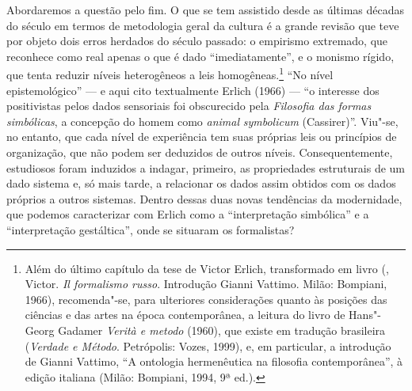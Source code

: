 Abordaremos a questão pelo fim. O que se tem assistido desde as últimas
décadas do século  em termos de metodologia geral da cultura é a
grande revisão que teve por objeto dois erros herdados do século
passado: o empirismo extremado, que reconhece como real apenas o que é
dado ``imediatamente'', e o monismo rígido, que tenta reduzir níveis
heterogêneos a leis homogêneas.\footnote{Além do último capítulo da
  tese de Victor Erlich, transformado em livro (, Victor. \emph{Il formalismo russo}. Introdução Gianni Vattimo. Milão: Bompiani, 1966), recomenda"-se, para ulteriores
  considerações quanto às posições das ciências e das
  artes na época contemporânea, a leitura do livro de Hans"-Georg Gadamer
  \emph{Verità e metodo} (1960), que existe em tradução brasileira
  (\emph{Verdade e Método}. Petrópolis: Vozes, 1999), e, em particular, a introdução
  de Gianni Vattimo, ``A ontologia hermenêutica na filosofia contemporânea'', à edição italiana (Milão: Bompiani, 1994, 9ª ed.).} ``No nível epistemológico'' --- e aqui cito textualmente Erlich (1966) --- ``o interesse dos
positivistas pelos dados sensoriais foi obscurecido pela \emph{Filosofia
das formas simbólicas}, a concepção do homem como \emph{animal}
\emph{symbolicum} (Cassirer)''.
Viu"-se, no entanto, que cada nível de experiência tem suas próprias leis ou
princípios de organização, que não podem ser deduzidos de outros níveis.
Consequentemente, estudiosos foram induzidos a indagar, primeiro, as
propriedades estruturais de um dado sistema e, só mais tarde, a
relacionar os dados assim obtidos com os dados próprios a outros
sistemas. Dentro dessas duas novas tendências da modernidade, que
podemos caracterizar com Erlich como a ``interpretação simbólica'' e a
``interpretação gestáltica'', onde se situaram os formalistas?

